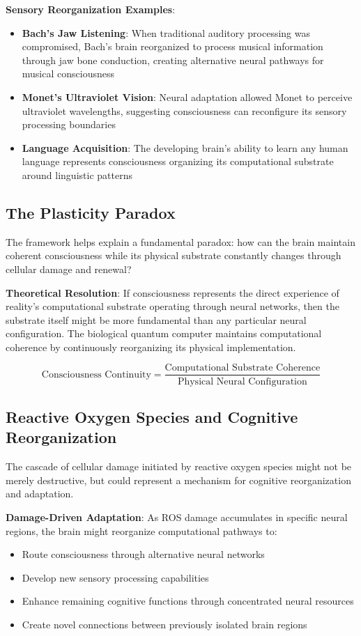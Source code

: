 \documentclass[12pt]{article}
\begin{document}
\textbf{Sensory Reorganization Examples}:
\begin{itemize}
\item \textbf{Bach's Jaw Listening}: When traditional auditory processing was compromised, Bach's brain reorganized to process musical information through jaw bone conduction, creating alternative neural pathways for musical consciousness
\item \textbf{Monet's Ultraviolet Vision}: Neural adaptation allowed Monet to perceive ultraviolet wavelengths, suggesting consciousness can reconfigure its sensory processing boundaries
\item \textbf{Language Acquisition}: The developing brain's ability to learn any human language represents consciousness organizing its computational substrate around linguistic patterns
\end{itemize}

\subsection{The Plasticity Paradox}

The framework helps explain a fundamental paradox: how can the brain maintain coherent consciousness while its physical substrate constantly changes through cellular damage and renewal?

\textbf{Theoretical Resolution}: If consciousness represents the direct experience of reality's computational substrate operating through neural networks, then the substrate itself might be more fundamental than any particular neural configuration. The biological quantum computer maintains computational coherence by continuously reorganizing its physical implementation.

$$\text{Consciousness Continuity} = \frac{\text{Computational Substrate Coherence}}{\text{Physical Neural Configuration}}$$

\subsection{Reactive Oxygen Species and Cognitive Reorganization}

The cascade of cellular damage initiated by reactive oxygen species might not be merely destructive, but could represent a mechanism for cognitive reorganization and adaptation.

\textbf{Damage-Driven Adaptation}: As ROS damage accumulates in specific neural regions, the brain might reorganize computational pathways to:
\begin{itemize}
\item Route consciousness through alternative neural networks
\item Develop new sensory processing capabilities
\item Enhance remaining cognitive functions through concentrated neural resources
\item Create novel connections between previously isolated brain regions
\end{itemize}
\end{document}
